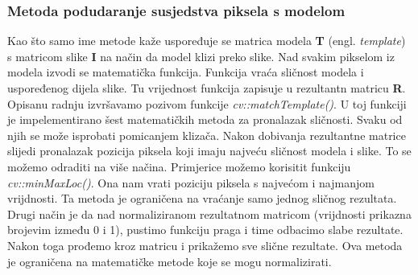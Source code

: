 \subsubsection{Metoda podudaranje susjedstva piksela s modelom}
Kao što samo ime metode kaže uspoređuje se matrica modela \textbf{T}
(engl. \textit{template}) s matricom slike \textbf{I} na način da
model klizi preko slike. Nad svakim pikselom iz modela izvodi se
matematička funkcija. Funkcija vraća sličnost modela i uspoređenog
dijela slike. Tu vrijednost funkcija zapisuje u rezultantn matricu
\textbf{R}. Opisanu radnju izvršavamo pozivom funkcije
\textit{cv::matchTemplate()}. U toj funkciji je impelementirano šest
matematičkih metoda za pronalazak sličnosti. Svaku od njih se može
isprobati pomicanjem klizača. Nakon dobivanja rezultantne matrice
slijedi pronalazak pozicija piksela koji imaju najveću sličnost modela i
slike. To se možemo odraditi na više načina. Primjerice možemo korisitit 
funkciju \textit{cv::minMaxLoc()}. Ona nam vrati poziciju piksela s najvećom i
najmanjom vrijdnosti. Ta metoda je ograničena na vraćanje samo jednog 
sličnog rezultata. Drugi način je da nad normaliziranom rezultatnom
matricom (vrijdnosti prikazna brojevim između 0 i 1), pustimo funkciju
praga i time odbacimo slabe rezultate. Nakon toga prođemo kroz
matricu i prikažemo sve slične rezultate. Ova metoda je ograničena na
matematičke metode koje se mogu normalizirati.
\\
